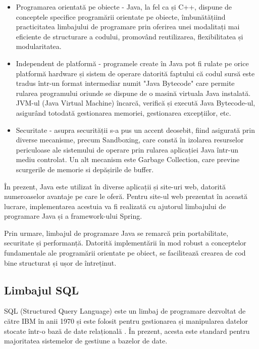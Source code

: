 \documentclass[12pt]{article}
\begin{document}
\begin{itemize}
    \item Programarea orientat\u{a} pe obiecte - Java, la fel ca și C++, dispune de conceptele specifice program\u{a}rii orientate pe obiecte, \^{i}mbun\u{a}t\u{a}țiind practicitatea limbajului de programare prin oferirea unei modalitați mai eficiente de structurare a codului, promov\^{a}nd reutilizarea, flexibilitatea și modularitatea.
    \item Independent de platform\u{a} - programele create \^{i}n Java pot fi rulate pe orice platform\u{a} hardware și sistem de operare datorit\u{a} faptului c\u{a} codul surs\u{a} este tradus \^{i}ntr-un format intermediar numit "Java Bytecode" care permite rularea programului oriunde se dispune de o masin\u{a} virtuala Java instalat\u{a}. JVM-ul (Java Virtual Machine) \^{i}ncarc\u{a}, verific\u{a} și execut\u{a} Java Bytecode-ul, asigur\^{a}nd totodat\u{a} gestionarea memoriei, gestionarea excepțiilor, etc.
    \item Securitate - asupra securit\u{a}ții s-a pus un accent deosebit, fiind asigurat\u{a} prin diverse mecanisme, precum Sandboxing, care const\u{a} \^{i}n izolarea resurselor periculoase ale sistemului de operare prin rularea aplicației Java \^{i}ntr-un mediu controlat. Un alt mecanism este Garbage Collection, care previne scurgerile de memorie si dep\u{a}șirile de buffer.
\end{itemize}

\^{I}n prezent, Java este utilizat \^{i}n diverse aplicații și site-uri web, datorit\u{a} numeroaselor avantaje pe care le ofer\u{a}. Pentru site-ul web prezentat \^{i}n aceast\u{a} lucrare, implementarea acestuia va fi realizat\u{a} cu ajutorul limbajului de programare Java și a framework-ului Spring.

Prin urmare, limbajul de programare Java se remarc\u{a} prin portabilitate, securitate și performanț\u{a}. Datorit\u{a} implement\u{a}rii \^{i}n mod robust a conceptelor fundamentale ale program\u{a}rii orientate pe obiect, se faciliteaz\u{a} crearea de cod bine structurat și ușor de \^{i}ntreținut.

\subsection{Limbajul SQL}

SQL (Structured Query Language) este un limbaj de programare dezvoltat de c\u{a}tre IBM \^{i}n anii 1970 și este folosit pentru gestionarea și manipularea datelor stocate \^{i}ntr-o baz\u{a} de date relațional\u{a} \cite{sqlref}. \^{I}n prezent, acesta este standard pentru majoritatea sistemelor de gestiune a bazelor de date. 
\end{document}
